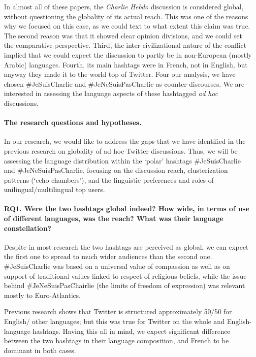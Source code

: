 In almost all of these papers, the \textit{Charlie Hebdo} discussion is considered global, without questioning the globality of its actual reach. This was one of the reasons why we focused on this case, as we could text to what extent this claim was true. The second reason was that it showed clear opinion divisions, and we could set the comparative perspective. Third, the inter-civilizational nature of the conflict implied that we could expect the discussion to partly be in non-European (mostly Arabic) languages. Fourth, its main hashtags were in French, not in English, but anyway they made it to the world top of Twitter. Four our analysis, we have chosen \#JeSuisCharlie and \#JeNeSuisPasCharlie as counter-discourses. We are interested in assessing the language aspects of these hashtagged \textit{ad hoc} discussions.

\paragraph{The research questions and hypotheses.} In our research, we would like to address the gaps that we have identified in the previous research on globality of ad hoc Twitter discussions. Thus, we will be assessing the language distribution within the ‘polar’ hashtags \#JeSuisCharlie and \#JeNeSuisPasCharlie, focusing on the discussion reach, clusterization patterns (‘echo chambers’), and the linguistic preferences and roles of unilingual/multilingual top users.

\paragraph{RQ1. Were the two hashtags global indeed? How wide, in terms of use of different languages, was the reach? What was their language constellation?}
Despite in most research the two hashtags are perceived as global, we can expect the first one to spread to much wider audiences than the second one. \#JeSuisCharlie was based on a universal value of compassion as well as on support of traditional values linked to respect of religious beliefs, while the issue behind \#JeNeSuisPasChairlie (the limits of freedom of expression) was relevant mostly to Euro-Atlantics.

Previous research shows that Twitter is structured approximately 50/50 for English/ other languages; but this was true for Twitter on the whole and English-language hashtags. Having this all in mind, we expect significant difference between the two hashtags in their language composition, and French to be dominant in both cases.


